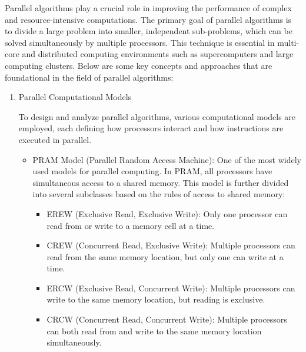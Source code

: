 \documentclass[a4paper, 10pt]{book}
\begin{document}
        Parallel algorithms play a crucial role in improving the performance of complex and resource-intensive computations. The primary goal of parallel algorithms is to divide a large problem into smaller, independent sub-problems, which can be solved simultaneously by multiple processors. This technique is essential in multi-core and distributed computing environments such as supercomputers and large computing clusters. Below are some key concepts and approaches that are foundational in the field of parallel algorithms:

        \begin{enumerate}
            
            \item {\bold Parallel Computational Models}
            
                To design and analyze parallel algorithms, various computational models are employed, each defining how processors interact and how instructions are executed in parallel.

                \begin{itemize}
                    
                    \item {\bold PRAM Model (Parallel Random Access Machine):} One of the most widely used models for parallel computing. In PRAM, all processors have simultaneous access to a shared memory. This model is further divided into several subclasses based on the rules of access to shared memory:
                    
                    \begin{itemize}
                        
                        \item {\bold EREW (Exclusive Read, Exclusive Write):} Only one processor can read from or write to a memory cell at a time.
                        
                        \item {\bold CREW (Concurrent Read, Exclusive Write):} Multiple processors can read from the same memory location, but only one can write at a time.

                        \item {\bold ERCW (Exclusive Read, Concurrent Write):} Multiple processors can write to the same memory location, but reading is exclusive.

                        \item {\bold CRCW (Concurrent Read, Concurrent Write):} Multiple processors can both read from and write to the same memory location simultaneously.


\end{itemize}
\end{itemize}
\end{enumerate}
\end{document}
